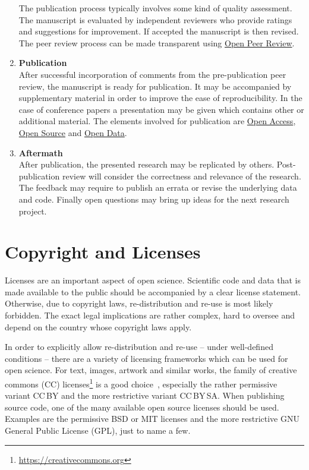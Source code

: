 \documentclass[a4paper, 10pt, twocolumn]{article}
\begin{document}
\begin{enumerate}
The publication process typically involves some kind of quality assessment. The manuscript is evaluated by
independent reviewers who provide ratings and suggestions for improvement. If accepted the manuscript is
then revised. The peer review process can be made transparent using \underline{Open Peer Review}.
%
\item \textbf{Publication}\\
After successful incorporation of comments from the pre-publication peer review, the manuscript is ready for
publication. It may be accompanied by supplementary material in order to improve the ease of reproducibility. In the
case of conference papers a presentation may be given which contains other or additional material. The elements involved
for publication are \underline{Open Access}, \underline{Open Source} and \underline{Open Data}.
%
\item \textbf{Aftermath}\\
After publication, the presented research may be replicated by others. Post-publication
review will consider the correctness and relevance of the research. The feedback may 
require to publish an errata or revise the underlying data and code. Finally open 
questions may bring up ideas for the next research project.
\end{enumerate}


\section*{Copyright and Licenses} \label{sec:copyright}


Licenses are an important aspect of open science. Scientific code and data that is made 
available to the public should be accompanied by a clear license statement. Otherwise,
due to copyright laws, re-distribution and re-use is most likely forbidden.
The exact legal implications are
rather complex, hard to oversee and depend on the country whose copyright laws apply.

In order to explicitly allow re-distribution and re-use -- under well-defined conditions -- there are
a variety of licensing frameworks which can be used for open science.
For text, images, artwork and similar works, the family of 
creative commons (CC) licenses\footnote{\url{https://creativecommons.org}} is a good choice~\cite{Kreuzer14:Book},
especially the rather permissive variant CC\,BY and the more restrictive variant CC\,BY\,SA.
When publishing source code, one of the many available open source licenses should be used.
Examples are the permissive BSD or MIT licenses and the more restrictive
GNU General Public License (GPL), just to name a few.
\end{document}
